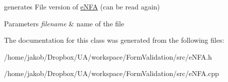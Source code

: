 generates File version of \hyperlink{classFA_1_1eNFA}{e\-N\-F\-A} (can be read again) 


\begin{DoxyParams}{Parameters}
{\em filename} & name of the file \\
\hline
\end{DoxyParams}


The documentation for this class was generated from the following files\-:\begin{DoxyCompactItemize}
\item 
/home/jakob/\-Dropbox/\-U\-A/workspace/\-Form\-Validation/src/e\-N\-F\-A.\-h\item 
/home/jakob/\-Dropbox/\-U\-A/workspace/\-Form\-Validation/src/e\-N\-F\-A.\-cpp\end{DoxyCompactItemize}
